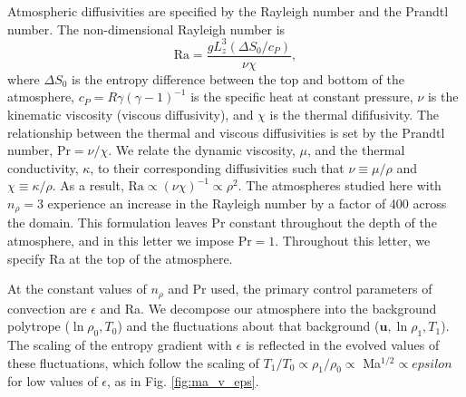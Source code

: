 \documentclass[aps, prl, twocolumn, nofootinbib, groupedaddress, amsfonts, amssymb, amsmath]{revtex4-1}
\begin{document}
Atmospheric diffusivities are specified by the Rayleigh number and the Prandtl number.  The
non-dimensional Rayleigh number is
\begin{equation}
\text{Ra} = \frac{g L_z^3 (\Delta S_0 / c_P)}{\nu\chi},
\end{equation}
where $\Delta S_0$ is the entropy difference between the top and bottom of the atmosphere, 
$c_P = R\gamma(\gamma-1)^{-1}$ is the specific heat at constant pressure,
$\nu$ is the kinematic viscosity (viscous diffusivity), and $\chi$ is the thermal dififusivity.  
The relationship between the thermal and viscous diffusivities is
set by the Prandtl number, Pr$ = \nu/\chi$.   We relate the dynamic viscosity, $\mu$, and the thermal conductivity,
$\kappa$, to their corresponding diffusivities such that 
$\nu \equiv \mu/\rho$ and $\chi \equiv \kappa/\rho$.  As a result, $\text{Ra} \propto (\nu\chi)^{-1} \propto
\rho^2$.  The atmospheres studied here with $n_{\rho} = 3$ experience an increase in the Rayleigh number 
by a factor of 400 across the domain.  This formulation leaves Pr
constant throughout the depth of the atmosphere, and in this letter we impose $\text{Pr} = 1$.
Throughout this letter, we specify Ra at the top of the atmosphere.

At the constant values of $n_\rho$ and Pr used, the primary control parameters of convection are $\epsilon$
and Ra.  We decompose our atmosphere into the background polytrope ($\ln\rho_{0}, T_{0}$) and the fluctuations
about that background ($\bm{u}, \ln\rho_{1}, T_{1}$).  The scaling of the entropy gradient with $\epsilon$
is reflected in the evolved values of these fluctuations, which follow the scaling of
$T_1/T_0 \propto \rho_{1}/\rho_{0} \propto$ Ma$^{1/2} \propto epsilon$ for low values of $\epsilon$,
as in Fig. \ref{fig:ma_v_eps}.
\end{document}
